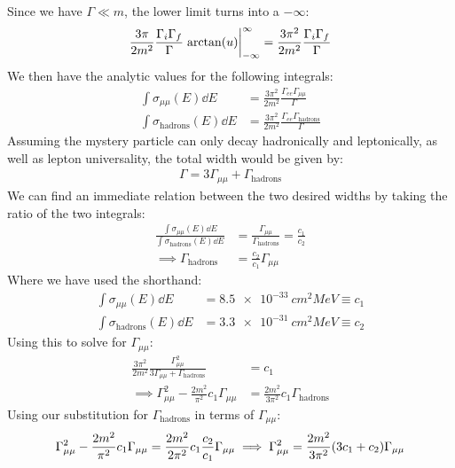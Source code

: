 \documentclass[12pt]{article}
\numberwithin{equation}{section}
\begin{document}
Since we have $\Gamma\ll m$, the lower limit turns into a $-\infty$:
\begin{align*}
  \frac{3\pi}{2m^2}\frac{\Gamma_i\Gamma_f}{\Gamma}
  \eval{\arctan(u)}_{-\infty}^\infty=
  \frac{3\pi^2}{2m^2}\frac{\Gamma_i\Gamma_f}{\Gamma}
\end{align*}
We then have the analytic values for the following integrals:
\begin{align*}
  \int\sigma_{\mu\mu}(E)\dd{E}&=
  \frac{3\pi^2}{2m^2}\frac{\Gamma_{ee}\Gamma_{\mu\mu}}{\Gamma}\\
  \int\sigma_{\text{hadrons}}(E)\dd{E}&=
  \frac{3\pi^2}{2m^2}\frac{\Gamma_{ee}\Gamma_{\text{hadrons}}}{\Gamma}
\end{align*}
Assuming the mystery particle can only decay hadronically and leptonically, as well as lepton universality, the total width would be given by:
\begin{align*}
  \Gamma=3\Gamma_{\mu\mu}+\Gamma_{\text{hadrons}}
\end{align*}
We can find an immediate relation between the two desired widths by taking the ratio of the two integrals:
\begin{align*}
  \frac{\int\sigma_{\mu\mu}(E)\dd{E}}{\int\sigma_{\text{hadrons}}(E)\dd{E}}
  &=\frac{\Gamma_{\mu\mu}}{\Gamma_{\text{hadrons}}}=\frac{c_1}{c_2}\\
  \implies\Gamma_{\text{hadrons}}&=\frac{c_2}{c_1}\Gamma_{\mu\mu}
\end{align*}
Where we have used the shorthand:
\begin{align*}
  \int\sigma_{\mu\mu}(E)\dd{E}&=\SI{8.5e-33}{cm^2MeV}\equiv c_1\\
  \int\sigma_{\text{hadrons}}(E)\dd{E}&=\SI{3.3e-31}{cm^2MeV}\equiv c_2
\end{align*}
Using this to solve for $\Gamma_{\mu\mu}$:
\begin{align*}
  \frac{3\pi^2}{2m^2}\frac{\Gamma^2_{\mu\mu}}
  {3\Gamma_{\mu\mu}+\Gamma_{\text{hadrons}}}&=c_1\\
  \implies\Gamma_{\mu\mu}^2-\frac{2m^2}{\pi^2}c_1\Gamma_{\mu\mu}&=
  \frac{2m^2}{3\pi^2}c_1\Gamma_{\text{hadrons}}
\end{align*}
Using our substitution for $\Gamma_{\text{hadrons}}$ in terms of $\Gamma_{\mu\mu}$:
\begin{align*}
  \Gamma_{\mu\mu}^2-\frac{2m^2}{\pi^2}c_1\Gamma_{\mu\mu}=
  \frac{2m^2}{2\pi^2}c_1\frac{c_2}{c_1}\Gamma_{\mu\mu}
  \implies\Gamma_{\mu\mu}^2=\frac{2m^2}{3\pi^2}\qty(3c_1+c_2)\Gamma_{\mu\mu}
\end{align*}
\end{document}
